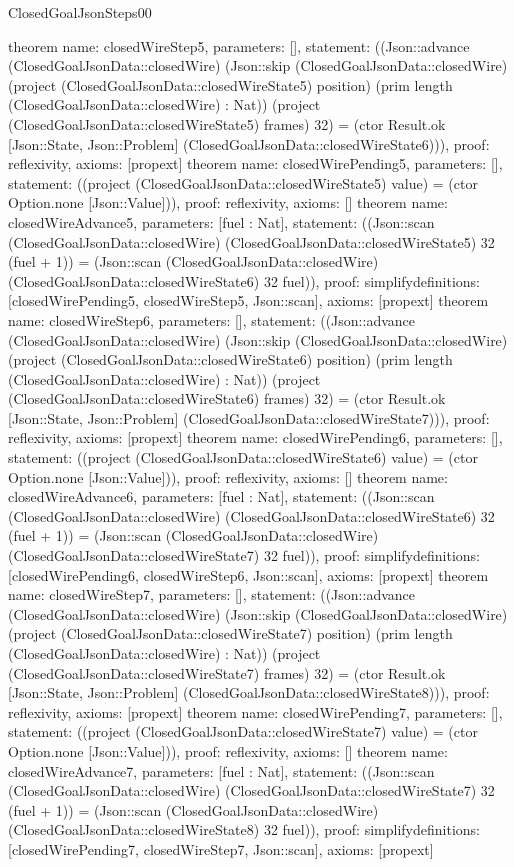 \begin{lexlean}{ClosedGoalJsonSteps00}
\begin{semanticmodule}
{}
theorem{
 name: closedWireStep5, parameters: [],
 statement: ((Json::advance (ClosedGoalJsonData::closedWire) (Json::skip (ClosedGoalJsonData::closedWire) (project (ClosedGoalJsonData::closedWireState5) position) (prim length (ClosedGoalJsonData::closedWire) : Nat)) (project (ClosedGoalJsonData::closedWireState5) frames) 32) = (ctor Result.ok [Json::State, Json::Problem] (ClosedGoalJsonData::closedWireState6))), proof: reflexivity{}, axioms: [propext]
}
theorem{
 name: closedWirePending5, parameters: [],
 statement: ((project (ClosedGoalJsonData::closedWireState5) value) = (ctor Option.none [Json::Value])), proof: reflexivity{}, axioms: []
}
theorem{
 name: closedWireAdvance5, parameters: [fuel : Nat],
 statement: ((Json::scan (ClosedGoalJsonData::closedWire) (ClosedGoalJsonData::closedWireState5) 32 (fuel + 1)) = (Json::scan (ClosedGoalJsonData::closedWire) (ClosedGoalJsonData::closedWireState6) 32 fuel)), proof: simplify{definitions: [closedWirePending5, closedWireStep5, Json::scan]}, axioms: [propext]
}
theorem{
 name: closedWireStep6, parameters: [],
 statement: ((Json::advance (ClosedGoalJsonData::closedWire) (Json::skip (ClosedGoalJsonData::closedWire) (project (ClosedGoalJsonData::closedWireState6) position) (prim length (ClosedGoalJsonData::closedWire) : Nat)) (project (ClosedGoalJsonData::closedWireState6) frames) 32) = (ctor Result.ok [Json::State, Json::Problem] (ClosedGoalJsonData::closedWireState7))), proof: reflexivity{}, axioms: [propext]
}
theorem{
 name: closedWirePending6, parameters: [],
 statement: ((project (ClosedGoalJsonData::closedWireState6) value) = (ctor Option.none [Json::Value])), proof: reflexivity{}, axioms: []
}
theorem{
 name: closedWireAdvance6, parameters: [fuel : Nat],
 statement: ((Json::scan (ClosedGoalJsonData::closedWire) (ClosedGoalJsonData::closedWireState6) 32 (fuel + 1)) = (Json::scan (ClosedGoalJsonData::closedWire) (ClosedGoalJsonData::closedWireState7) 32 fuel)), proof: simplify{definitions: [closedWirePending6, closedWireStep6, Json::scan]}, axioms: [propext]
}
theorem{
 name: closedWireStep7, parameters: [],
 statement: ((Json::advance (ClosedGoalJsonData::closedWire) (Json::skip (ClosedGoalJsonData::closedWire) (project (ClosedGoalJsonData::closedWireState7) position) (prim length (ClosedGoalJsonData::closedWire) : Nat)) (project (ClosedGoalJsonData::closedWireState7) frames) 32) = (ctor Result.ok [Json::State, Json::Problem] (ClosedGoalJsonData::closedWireState8))), proof: reflexivity{}, axioms: [propext]
}
theorem{
 name: closedWirePending7, parameters: [],
 statement: ((project (ClosedGoalJsonData::closedWireState7) value) = (ctor Option.none [Json::Value])), proof: reflexivity{}, axioms: []
}
theorem{
 name: closedWireAdvance7, parameters: [fuel : Nat],
 statement: ((Json::scan (ClosedGoalJsonData::closedWire) (ClosedGoalJsonData::closedWireState7) 32 (fuel + 1)) = (Json::scan (ClosedGoalJsonData::closedWire) (ClosedGoalJsonData::closedWireState8) 32 fuel)), proof: simplify{definitions: [closedWirePending7, closedWireStep7, Json::scan]}, axioms: [propext]
}
\end{semanticmodule}
\end{lexlean}
